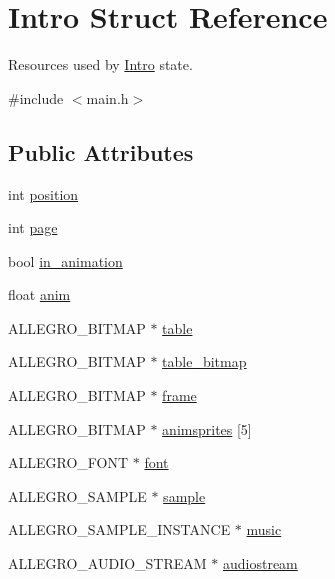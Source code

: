 \hypertarget{structIntro}{\section{Intro Struct Reference}
\label{structIntro}
}


Resources used by \hyperlink{structIntro}{Intro} state.  




{\ttfamily \#include $<$main.\-h$>$}

\subsection*{Public Attributes}
\begin{DoxyCompactItemize}
\item 
int \hyperlink{structIntro_a5c266b2590d4304f92fd3bad033f4375}{position}
\item 
int \hyperlink{structIntro_aaea1b2d24c0c9a5437c59d727c79ebd1}{page}
\item 
bool \hyperlink{structIntro_a2876fd8a7bfd940c3936eb6445984a22}{in\-\_\-animation}
\item 
float \hyperlink{structIntro_a7bac02ef374847f0efbe638892cb401f}{anim}
\item 
A\-L\-L\-E\-G\-R\-O\-\_\-\-B\-I\-T\-M\-A\-P $\ast$ \hyperlink{structIntro_a342227f3940dba9ed6b5d3bb4579fd48}{table}
\item 
A\-L\-L\-E\-G\-R\-O\-\_\-\-B\-I\-T\-M\-A\-P $\ast$ \hyperlink{structIntro_a77ea358d1f44d69e5477f5dedfc9fd2b}{table\-\_\-bitmap}
\item 
A\-L\-L\-E\-G\-R\-O\-\_\-\-B\-I\-T\-M\-A\-P $\ast$ \hyperlink{structIntro_a122ded263b7d3b22ee9a11555d84df52}{frame}
\item 
A\-L\-L\-E\-G\-R\-O\-\_\-\-B\-I\-T\-M\-A\-P $\ast$ \hyperlink{structIntro_ae89a2ad7dfed9e06a558a5f92bba55bc}{animsprites} \mbox{[}5\mbox{]}
\item 
A\-L\-L\-E\-G\-R\-O\-\_\-\-F\-O\-N\-T $\ast$ \hyperlink{structIntro_a896d4fdd74cf47535173eeaa6e81f734}{font}
\item 
A\-L\-L\-E\-G\-R\-O\-\_\-\-S\-A\-M\-P\-L\-E $\ast$ \hyperlink{structIntro_a0189475d44f8e19e6fe543371a9daedb}{sample}
\item 
A\-L\-L\-E\-G\-R\-O\-\_\-\-S\-A\-M\-P\-L\-E\-\_\-\-I\-N\-S\-T\-A\-N\-C\-E $\ast$ \hyperlink{structIntro_a461ce3f44fd4f7d2d3713e2f31c1d1ec}{music}
\item 
A\-L\-L\-E\-G\-R\-O\-\_\-\-A\-U\-D\-I\-O\-\_\-\-S\-T\-R\-E\-A\-M $\ast$ \hyperlink{structIntro_a879aa48597b2f7b6fbeb9f9911234350}{audiostream}
\end{DoxyCompactItemize}


